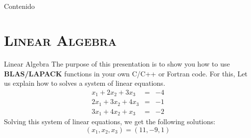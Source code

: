 \documentclass[xcolor=x11names,compress]{beamer}
\renewcommand{\(}{\begin{columns}}
\renewcommand{\)}{\end{columns}}
\newcommand{\<}[1]{\begin{column}{#1}}
\renewcommand{\>}{\end{column}}
\begin{document}
\section{}
\begin{frame}{Contenido}
\tableofcontents
\end{frame}
\section{\scshape Linear Algebra}
\begin{frame}[fragile]{Linear Algebra}
The purpose of this presentation is to show you how to use \textbf{BLAS\;/LAPACK} functions in your own C/C++ or Fortran code.
For this, Let us explain how to solves a system of linear equations.  
\begin{eqnarray*}
 x_1 + 2 x_2 + 3 x_3 & = & -4 \\
 2 x_1 + 3 x_2 + 4 x_3 & = & -1 \\
 3 x_1 + 4 x_2 + x_3 & = & -2 
\end{eqnarray*}
Solving this system of linear equations, we get the following solutions:
\[(x_1,x_2,x_3) = (11,-9,1)\]
\end{frame}
\end{document}
